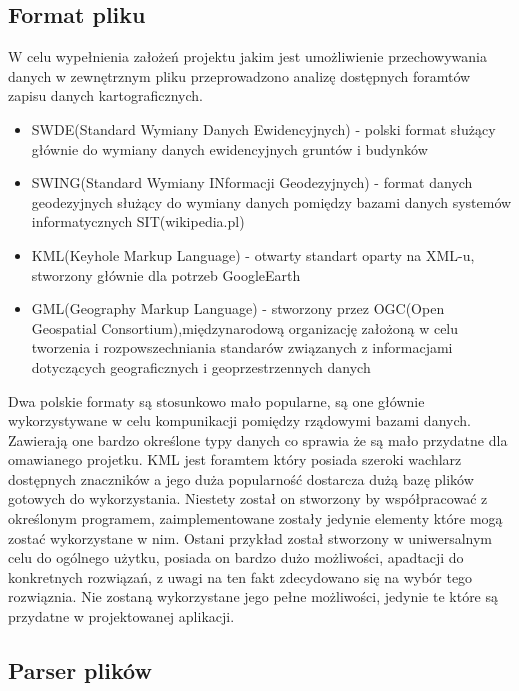 \subsection{Format pliku}
\label{subsec:fileformat}

W celu wypełnienia założeń projektu jakim jest umożliwienie przechowywania danych w zewnętrznym pliku przeprowadzono analizę dostępnych foramtów zapisu danych kartograficznych.

\begin{itemize}

\item
SWDE(Standard Wymiany Danych Ewidencyjnych) - polski format służący głównie do wymiany danych ewidencyjnych gruntów i budynków

\item
SWING(Standard Wymiany INformacji Geodezyjnych) - format danych geodezyjnych służący do wymiany danych pomiędzy bazami danych systemów informatycznych SIT(wikipedia.pl)

\item
KML(Keyhole Markup Language) - otwarty standart oparty na XML-u, stworzony głównie dla potrzeb GoogleEarth

\item
GML(Geography Markup Language) - stworzony przez OGC(Open Geospatial Consortium),międzynarodową organizację założoną w celu tworzenia i rozpowszechniania standarów związanych z informacjami dotyczących geograficznych i geoprzestrzennych danych

\end{itemize}

Dwa polskie formaty są stosunkowo mało popularne, są one głównie wykorzystywane w celu kompunikacji pomiędzy rządowymi bazami danych. Zawierają one bardzo określone typy danych co sprawia że są mało przydatne dla omawianego projetku. KML jest foramtem który posiada szeroki wachlarz dostępnych znaczników a jego duża popularność dostarcza dużą bazę plików gotowych do wykorzystania. Niestety został on stworzony by współpracować z określonym programem, zaimplementowane zostały jedynie elementy które mogą zostać wykorzystane w nim. Ostani przykład został stworzony w uniwersalnym celu do ogólnego użytku, posiada on bardzo dużo możliwości, apadtacji do konkretnych rozwiązań\cite{gml}, z uwagi na ten fakt zdecydowano się na wybór tego rozwiąznia. Nie zostaną wykorzystane jego pełne możliwości, jedynie te które są przydatne w projektowanej aplikacji.


\subsection{Parser plików}
\label{subsec:parser}

